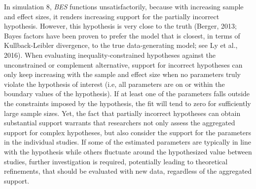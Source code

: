 \documentclass[
]{interact}
\begin{document}
                    In simulation 8, \emph{BES} functions unsatisfactorily, because with
                    increasing sample and effect sizes, it renders increasing support for
                    the partially incorrect hypothesis. However, this hypothesis is very
                    close to the truth (Berger, 2013; Bayes factors have been proven to
                                        prefer the model that is closest, in terms of Kullback-Leibler
                                        divergence, to the true data-generating model; see Ly et al., 2016).
                    When evaluating inequality-constrained hypotheses against the
                    unconstrained or complement alternative, support for incorrect
                    hypotheses can only keep increasing with the sample and effect size when
                    no parameters truly violate the hypothesis of interest (i.e, all
                                                                            parameters are on or within the boundary values of the hypothesis). If
                    at least one of the parameters falls outside the constraints imposed by
                    the hypothesis, the fit will tend to zero for sufficiently large sample
                    sizes. Yet, the fact that partially incorrect hypotheses can obtain
                    substantial support warrants that researchers not only assess the
                    aggregated support for complex hypotheses, but also consider the support
                    for the parameters in the individual studies. If some of the estimated
                    parameters are typically in line with the hypothesis while others
                    fluctuate around the hypothesized value between studies, further
                    investigation is required, potentially leading to theoretical
                    refinements, that should be evaluated with new data, regardless of the
                    aggregated support.
                    
\end{document}
